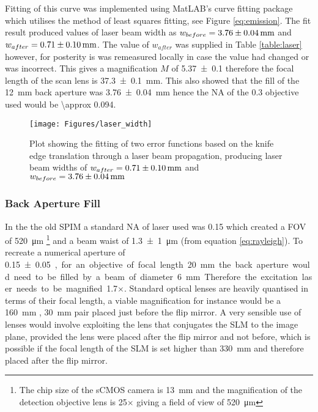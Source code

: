 \documentclass[10pt,a4paper]{report}
\begin{document}
\begin{spacing}{1.5}
Fitting of this curve was implemented using MatLAB's curve fitting package which utilises the method of least squares fitting, see Figure \ref{eq:emission}. The fit result produced values of laser beam width as $w_{before} = \SI{3.76\pm0.04}{\milli\meter}$ and $w_{after} = \SI{0.71\pm0.1}{\milli\meter}$. The value of $w_{after}$ was supplied in Table \ref{table:laser} however, for posterity is was remeasured locally in case the value had changed or was incorrect. This gives a magnification $M$ of \SI{5.37 \pm 0.1}{} therefore the focal length of the scan lens is \SI{37.3\pm0.1}{\milli\meter}. This also showed that the fill of the \SI{12}{\milli\meter} back aperture was \SI{3.76\pm0.04}{\milli\meter} hence the NA of the \num{0.3} objective used would be \SI{\approx 0.094}{}.

\begin{figure}
\centering
\texttt{[image: Figures/laser\_width]}
\caption[Laser Width Fitting]{Plot showing the fitting of two error functions based on the knife edge translation through a laser beam propagation, producing laser beam widths of $w_{after} = \SI{0.71\pm0.1}{\milli\meter}$ and $w_{before} = \SI{3.76\pm0.04}{\milli\meter}$}
\label{fig:laser_width}
\end{figure}

\subsubsection{Back Aperture Fill}

In the the old SPIM a standard NA of laser used was 0.15 which created a FOV of \SI{520}{\micro\meter} \footnote{The chip size of the sCMOS camera is \SI{13}{\milli\meter} and the magnification of the detection objective lens is \SI{25}{}$\times$ giving a field of view of \SI{520}{\micro\meter}} and a beam waist of \SI{1.3 \pm 1}{\micro\meter} (from equation \ref{eq:rayleigh}). To recreate a numerical aperture of \SI{0.15 \pm 0.05}, for an objective of focal length \SI{20}{\milli\meter}  the back aperture would need to be filled by a beam of diameter \SI{6}{\milli\meter}. Therefore the excitation laser needs to be magnified \SI{1.7}{}$\times$. Standard optical lenses are heavily quantised in terms of their focal length, a viable magnification for instance would be a \SI{160}{\milli\meter} , \SI{30}{\milli\meter} pair placed just before the flip mirror. A very sensible use of lenses would involve exploiting the lens that conjugates the SLM to the image plane, provided the lens were placed after the flip mirror and not before, which is possible if the focal length of the SLM is set higher than \SI{330}{\milli\meter} and therefore placed after the flip mirror.


\end{spacing}
\end{document}
